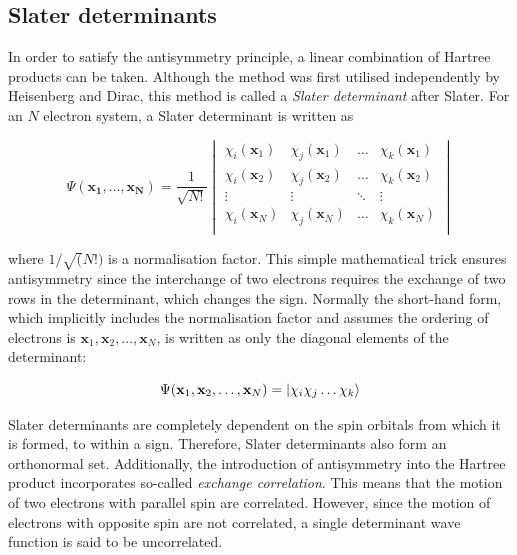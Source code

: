 \subsection{Slater determinants}

In order to satisfy the antisymmetry principle, a linear combination of Hartree
products can be taken. Although the method was first utilised independently by
Heisenberg\cite{Heisenberg1926} and Dirac,\cite{Dirac1926} this method is called
a \emph{Slater determinant} after Slater.\cite{Slater1929} For an $N$ electron
system, a Slater determinant is written as

\begin{equation}
\Psi(\mathbf{x_1},\ldots,\mathbf{x_N}) = \frac{1}{\sqrt{N!}}
\begin{vmatrix}
\chi_i(\mathbf{x}_1) & \chi_j(\mathbf{x}_1) & \dots & \chi_k(\mathbf{x}_1) \\
\chi_i(\mathbf{x}_2) & \chi_j(\mathbf{x}_2) & \dots & \chi_k(\mathbf{x}_2) \\
\vdots & \vdots & \ddots & \vdots \\
\chi_i(\mathbf{x}_N) & \chi_j(\mathbf{x}_N) & \dots & \chi_k(\mathbf{x}_N) \\
\end{vmatrix}
\end{equation}

\noindent where $1/\sqrt(N!)$ is a normalisation factor. This simple
mathematical trick ensures antisymmetry since the interchange of two electrons
requires the exchange of two rows in the determinant, which changes the
sign. Normally the short-hand form, which implicitly includes the normalisation
factor and assumes the ordering of electrons is
$\mathbf{x}_1,\mathbf{x}_2,\dots,\mathbf{x}_N$, is written as only the diagonal
elements of the determinant:

\begin{equation}
  \Psi(\mathbf{x}_1,\mathbf{x}_2,\dots,\mathbf{x}_N) = \ket{\chi_i\chi_j\dots\chi_k}
\end{equation}

Slater determinants are completely dependent on the spin orbitals from which it
is formed, to within a sign. Therefore, Slater determinants also form an
orthonormal set. Additionally, the introduction of antisymmetry into the Hartree
product incorporates so-called \emph{exchange correlation}. This means that the
motion of two electrons with parallel spin are correlated. However, since the
motion of electrons with opposite spin are not correlated, a single determinant
wave function is said to be uncorrelated.

